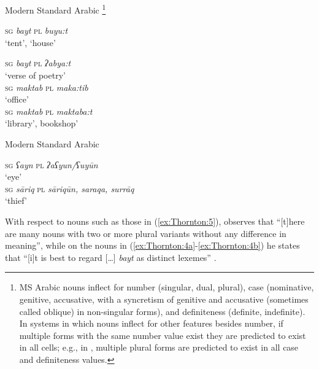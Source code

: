 \documentclass[output=paper]{langsci/langscibook}
\begin{document}
\newpage 
\ea\label{ex:Thornton:4} Modern Standard Arabic %
\citep{Holes2004,Kaye2007}%
%
\footnote{MS Arabic
  nouns inflect for number (singular, dual, plural), case (nominative,
  genitive, accusative, with a syncretism of genitive and accusative
  (sometimes called oblique) in non-singular forms), and definiteness
  (definite, indefinite). In systems in which nouns inflect for other
  features besides number, if multiple forms with the same number value
  exist they are predicted to exist in all cells; e.g., in ,
  multiple plural forms are predicted to exist in all case and
  definiteness values.}

\ea\label{ex:Thornton:4a}\textsc{sg} \emph{bayt} \textsc{pl} \emph{buyu:t}\\
\glt  `tent', `house'\glt

\ex\label{ex:Thornton:4b}\textsc{sg} \emph{bayt} \textsc{pl} \emph{ʔabya:t}\\
\glt  `verse of poetry'\\

\ex\label{ex:Thornton:4c}\textsc{sg} \emph{maktab} \textsc{pl} \emph{maka:tib}\\
\glt  `office'\\

\ex\label{ex:Thornton:4d}\textsc{sg} \emph{maktab} \textsc{pl} \emph{maktaba:t}\\
\glt  `library', bookshop'
\z

\ex\label{ex:Thornton:5} Modern Standard Arabic %
\citep{Kaye2007}%
%


\ea\label{ex:Thornton:5a}\textsc{sg} \emph{ʕayn} \textsc{pl} \emph{ʔaʕyun\slash{}ʕuyūn}\\
\glt `eye'\\


\ex\label{ex:Thornton:5b}\textsc{sg} \emph{sāriq} \textsc{pl} \emph{sāriqūn, saraqa, surrāq}\\
\glt `thief' \\
\z
\z

With respect to nouns such as those in (\ref{ex:Thornton:5}), \citet[234--235]{Kaye2007} 
observes that ``[t]here are many nouns with two or more plural variants
without any difference in meaning'', while on the nouns in (\ref{ex:Thornton:4a}-\ref{ex:Thornton:4b}) he
states that ``[i]t is best to regard {[}\ldots{}{]} \emph{bayt} as
distinct lexemes'' %
\citep[234]{Kaye2007}%
%
.
\end{document}
